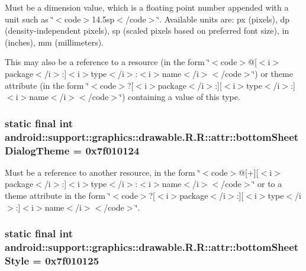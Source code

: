 Must be a dimension value, which is a floating point number appended with a unit such as \char`\"{}$<$code$>$14.5sp$<$/code$>$\char`\"{}. Available units are: px (pixels), dp (density-independent pixels), sp (scaled pixels based on preferred font size), in (inches), mm (millimeters). 

This may also be a reference to a resource (in the form \char`\"{}$<$code$>$@\mbox{[}$<$i$>$package$<$/i$>$:\mbox{]}$<$i$>$type$<$/i$>$:$<$i$>$name$<$/i$>$$<$/code$>$\char`\"{}) or theme attribute (in the form \char`\"{}$<$code$>$?\mbox{[}$<$i$>$package$<$/i$>$:\mbox{]}\mbox{[}$<$i$>$type$<$/i$>$:\mbox{]}$<$i$>$name$<$/i$>$$<$/code$>$\char`\"{}) containing a value of this type. \hypertarget{classandroid_1_1support_1_1graphics_1_1drawable_1_1_r_1_1attr_e8c2cdbd326f86c4b092ea82d6afe9c8}{
\subsubsection[{bottomSheetDialogTheme}]{\setlength{\rightskip}{0pt plus 5cm}static final int android::support::graphics::drawable.R.R::attr::bottomSheetDialogTheme = 0x7f010124}}
\label{classandroid_1_1support_1_1graphics_1_1drawable_1_1_r_1_1attr_e8c2cdbd326f86c4b092ea82d6afe9c8}


Must be a reference to another resource, in the form \char`\"{}$<$code$>$@\mbox{[}+\mbox{]}\mbox{[}$<$i$>$package$<$/i$>$:\mbox{]}$<$i$>$type$<$/i$>$:$<$i$>$name$<$/i$>$$<$/code$>$\char`\"{} or to a theme attribute in the form \char`\"{}$<$code$>$?\mbox{[}$<$i$>$package$<$/i$>$:\mbox{]}\mbox{[}$<$i$>$type$<$/i$>$:\mbox{]}$<$i$>$name$<$/i$>$$<$/code$>$\char`\"{}. \hypertarget{classandroid_1_1support_1_1graphics_1_1drawable_1_1_r_1_1attr_ce10fc0d0990ed87f357957522f9b13e}{
\subsubsection[{bottomSheetStyle}]{\setlength{\rightskip}{0pt plus 5cm}static final int android::support::graphics::drawable.R.R::attr::bottomSheetStyle = 0x7f010125}}
\label{classandroid_1_1support_1_1graphics_1_1drawable_1_1_r_1_1attr_ce10fc0d0990ed87f357957522f9b13e}


